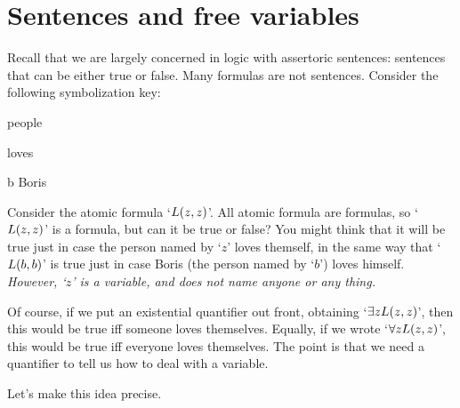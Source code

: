 

\section{Sentences and free variables}
Recall that we are largely concerned in logic with assertoric sentences: sentences that can be either true or false. Many formulas are not sentences. Consider the following symbolization key:
	\begin{ekey}
		\item[\text{domain}] people
		\item[\atom{L}{x,y}]  loves 
		\item[b] Boris
	\end{ekey}
Consider the atomic formula `$\mathord{L}(z,z)$'. All atomic formula are formulas, so `$\mathord{L}(z,z)$' is a formula, but can it be true or false? You might think that it will be true just in case the person named by `$z$' loves themself, in the same way that `$\mathord{L}(b,b)$' is true just in case Boris (the person named by `$b$') loves himself. \emph{However, `$z$' is a variable, and does not name anyone or any thing.}

Of course, if we put an existential quantifier out front, obtaining `$\exists z\mathord{L}(z,z)$', then this would be true iff someone loves themselves. Equally, if we wrote `$\forall z \mathord{L}(z,z)$', this would be true iff everyone loves themselves. The point is that we need a quantifier to tell us how to deal with a variable. 

Let's make this idea precise.



